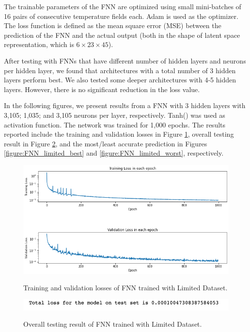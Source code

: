 The trainable parameters of the FNN are optimized using small mini-batches of 16 pairs of consecutive temperature fields each. Adam is used as the optimizer. The loss function is defined as the mean square error (MSE) between the prediction of the FNN and the actual output (both in the shape of latent space representation, which is $6 \times 23 \times 45$).

After testing with FNNs that have different number of hidden layers and neurons per hidden layer, we found that architectures with a total number of 3 hidden layers perform best. We also tested some deeper architectures with 4-5 hidden layers. However, there is no significant reduction in the loss value.

In the following figures, we present results from a FNN with 3 hidden layers with 3,105; 1,035; and 3,105 neurons per layer, respectively. Tanh() was used as activation function. The network was trained for 1,000 epochs. The results reported include the training and validation losses in Figure \ref{figure:FNN_limited_losses}, overall testing result in Figure \ref{figure:FNN_limited_testing}, and the most/least accurate prediction in Figures \ref{figure:FNN_limited_best} and \ref{figure:FNN_limited_worst}, respectively.

\begin{figure}[H]
    \caption{Training and validation losses of FNN trained with Limited Dataset.}
    \includegraphics[scale=0.6]{figures/mantle_convection_images/limited_dataset/FNN_trainingData.png}
    \label{figure:FNN_limited_losses}
\end{figure}

\begin{figure}[H]
    \caption{Overall testing result of FNN trained with Limited Dataset.}
    \includegraphics[scale=0.8]{figures/mantle_convection_images/limited_dataset/FNN_OverallTesting.png}
    \label{figure:FNN_limited_testing}
\end{figure}

